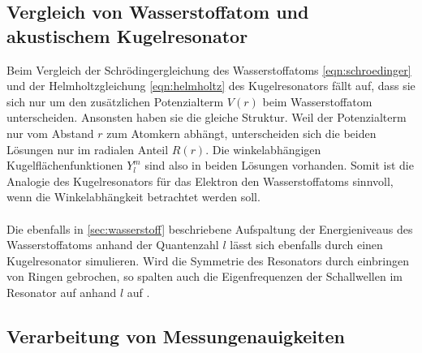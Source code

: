 \subsection{Vergleich von Wasserstoffatom und akustischem Kugelresonator}
Beim Vergleich der Schrödingergleichung des Wasserstoffatoms \ref{eqn:schroedinger} und der Helmholtzgleichung \ref{eqn:helmholtz} des Kugelresonators fällt auf, dass sie sich nur um den zusätzlichen Potenzialterm $V\left(r\right)$ beim Wasserstoffatom unterscheiden.
Ansonsten haben sie die gleiche Struktur.
Weil der Potenzialterm nur vom Abstand $r$ zum Atomkern abhängt, unterscheiden sich die beiden Lösungen nur im radialen Anteil $R\left(r\right)$.
Die winkelabhängigen Kugelflächenfunktionen $Y_l^m$ sind also in beiden Lösungen vorhanden. 
Somit ist die Analogie des Kugelresonators für das Elektron den Wasserstoffatoms sinnvoll, wenn die Winkelabhängkeit betrachtet werden soll. 
\\\\
Die ebenfalls in \autoref{sec:wasserstoff} beschriebene Aufspaltung der Energieniveaus des Wasserstoffatoms anhand der Quantenzahl $l$ lässt sich ebenfalls durch einen Kugelresonator simulieren.
Wird die Symmetrie des Resonators durch einbringen von Ringen gebrochen, so spalten auch die Eigenfrequenzen der Schallwellen im Resonator auf anhand $l$ auf \cite{Quantum_Analogs}. 
%
%
%
\subsection{Verarbeitung von Messungenauigkeiten}

